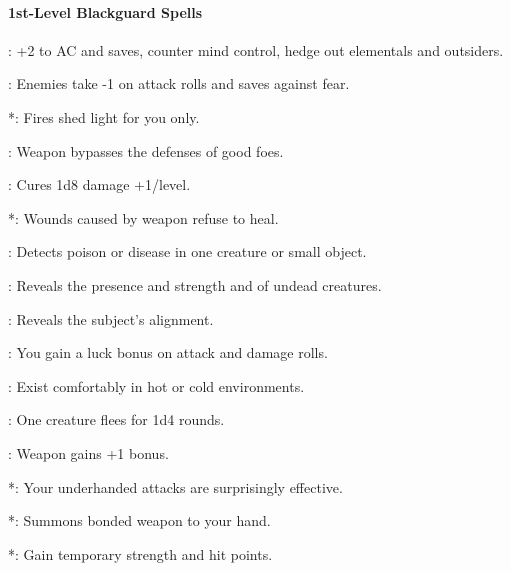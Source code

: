 \paragraph{1st-Level Blackguard Spells}
\begin{list}{}{\leftmargin=1em}
\item {}: +2 to AC and saves, counter mind control, hedge out elementals and outsiders.
\item {}: Enemies take -1 on attack rolls and saves against fear.%
\item {}*: Fires shed light for you only. %
\item {}: Weapon bypasses the defenses of good foes. %
\item {}: Cures 1d8 damage +1/level.
\item {}*: Wounds caused by weapon refuse to heal. %
\item {}: Detects poison or disease in one creature or small object.
\item {}: Reveals the presence and strength and of undead creatures.
\item {}: Reveals the subject's alignment.
\item {}: You gain a luck bonus on attack and damage rolls.
\item {}: Exist comfortably in hot or cold environments.
\item {}: One creature flees for 1d4 rounds. %
\item {}: Weapon gains +1 bonus.
\item {}*: Your underhanded attacks are surprisingly effective. %
\item {}*: Summons bonded weapon to your hand.
\item {}*: Gain temporary strength and hit points.
\end{list}
